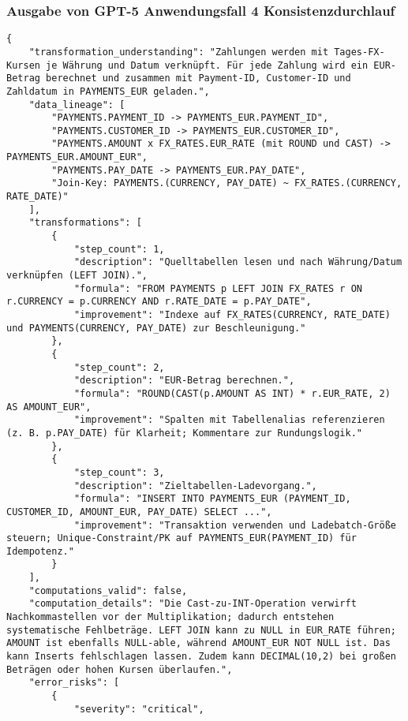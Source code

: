 \subsubsection{Ausgabe von GPT-5 Anwendungsfall 4 Konsistenzdurchlauf}\label{anhang:subsubsec:gpt_case4_prompt2}
\begin{lstlisting}[caption={Ausgabe: GPT-5 Anwendungsfall 4 Konsistenzdurchlauf},label={gpt_case4_prompt2}]
{
    "transformation_understanding": "Zahlungen werden mit Tages-FX-Kursen je Währung und Datum verknüpft. Für jede Zahlung wird ein EUR-Betrag berechnet und zusammen mit Payment-ID, Customer-ID und Zahldatum in PAYMENTS_EUR geladen.",
    "data_lineage": [
        "PAYMENTS.PAYMENT_ID -> PAYMENTS_EUR.PAYMENT_ID",
        "PAYMENTS.CUSTOMER_ID -> PAYMENTS_EUR.CUSTOMER_ID",
        "PAYMENTS.AMOUNT x FX_RATES.EUR_RATE (mit ROUND und CAST) -> PAYMENTS_EUR.AMOUNT_EUR",
        "PAYMENTS.PAY_DATE -> PAYMENTS_EUR.PAY_DATE",
        "Join-Key: PAYMENTS.(CURRENCY, PAY_DATE) ~ FX_RATES.(CURRENCY, RATE_DATE)"
    ],
    "transformations": [
        {
            "step_count": 1,
            "description": "Quelltabellen lesen und nach Währung/Datum verknüpfen (LEFT JOIN).",
            "formula": "FROM PAYMENTS p LEFT JOIN FX_RATES r ON r.CURRENCY = p.CURRENCY AND r.RATE_DATE = p.PAY_DATE",
            "improvement": "Indexe auf FX_RATES(CURRENCY, RATE_DATE) und PAYMENTS(CURRENCY, PAY_DATE) zur Beschleunigung."
        },
        {
            "step_count": 2,
            "description": "EUR-Betrag berechnen.",
            "formula": "ROUND(CAST(p.AMOUNT AS INT) * r.EUR_RATE, 2) AS AMOUNT_EUR",
            "improvement": "Spalten mit Tabellenalias referenzieren (z. B. p.PAY_DATE) für Klarheit; Kommentare zur Rundungslogik."
        },
        {
            "step_count": 3,
            "description": "Zieltabellen-Ladevorgang.",
            "formula": "INSERT INTO PAYMENTS_EUR (PAYMENT_ID, CUSTOMER_ID, AMOUNT_EUR, PAY_DATE) SELECT ...",
            "improvement": "Transaktion verwenden und Ladebatch-Größe steuern; Unique-Constraint/PK auf PAYMENTS_EUR(PAYMENT_ID) für Idempotenz."
        }
    ],
    "computations_valid": false,
    "computation_details": "Die Cast-zu-INT-Operation verwirft Nachkommastellen vor der Multiplikation; dadurch entstehen systematische Fehlbeträge. LEFT JOIN kann zu NULL in EUR_RATE führen; AMOUNT ist ebenfalls NULL-able, während AMOUNT_EUR NOT NULL ist. Das kann Inserts fehlschlagen lassen. Zudem kann DECIMAL(10,2) bei großen Beträgen oder hohen Kursen überlaufen.",
    "error_risks": [
        {
            "severity": "critical",

\end{lstlisting}
